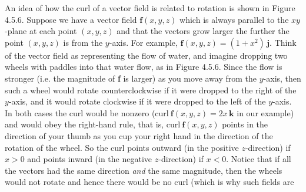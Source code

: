 An idea of how the curl of a vector field is related to rotation is shown in Figure 4.5.6. Suppose we have a
vector field $\textbf{f}(x,y,z)$ which is always parallel to the $xy$-plane at each point $(x,y,z)$ and that
the vectors grow larger the further the point $(x,y,z)$ is from the $y$-axis. For example, $\textbf{f}(x,y,z) =
(1+x^2 )\,\textbf{j}$. Think of the vector field as representing the flow of water, and imagine dropping
two wheels with paddles into that water flow, as in Figure 4.5.6. Since the flow is stronger (i.e. the
magnitude of \textbf{f} is larger) as you move away from the $y$-axis, then such a wheel would rotate counterclockwise
if it were dropped to the
right of the $y$-axis, and it would rotate clockwise if it were dropped to the left of the $y$-axis. In both cases the
curl would be nonzero ($\text{curl}~\textbf{f}(x,y,z) = 2x\,\textbf{k}$ in our example) and would obey the right-hand
rule, that is, $\text{curl}~\textbf{f}(x,y,z)$ points in the direction of your thumb as you cup your right hand in the
direction of the rotation of the wheel. So the curl points outward (in the positive $z$-direction) if $x > 0$ and points
inward (in the negative $z$-direction) if $x < 0$. Notice that if all the vectors had the same direction \emph{and} the
same magnitude, then the wheels would not rotate and hence there would be no curl (which is why such fields are
